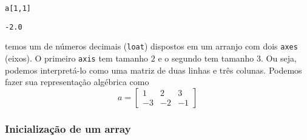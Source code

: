\documentclass[a4paper,10pt,twoside]{article}
\begin{document}
\begin{lstlisting}
a[1,1]
\end{lstlisting}

\begin{verbatim}
-2.0
\end{verbatim}

temos um {\PYTHONnumpyDOTarray} de números decimais (\texttt{loat}) dispostos em um arranjo com dois \texttt{axes} (eixos). O primeiro \texttt{axis} tem tamanho $2$ e o segundo tem tamanho $3$. Ou seja, podemos interpretá-lo como uma matriz de duas linhas e três colunas. Podemos fazer sua representação algébrica como
\begin{equation}
  a =
  \begin{bmatrix}
    1 & 2 & 3\\
    -3 & -2 & -1 
  \end{bmatrix}
\end{equation}

\subsubsection{Inicialização de um array}\label{subsubsection:iniarray}
\end{document}
